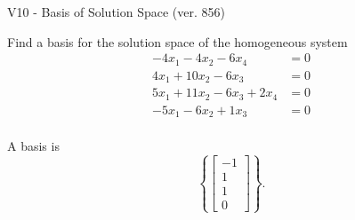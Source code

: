 \begin{exercise}
  \begin{exerciseTitle}V10 - Basis of Solution Space (ver. 856)\end{exerciseTitle}
  \begin{exerciseStatement}
    Find a basis for the solution space of the homogeneous system 
\begin{align*}
 -4 x_ 1 -4 x_ 2 -6 x_ 4 &= 0  \\ 
  4 x_ 1 + 10 x_ 2 -6 x_ 3 &= 0  \\ 
  5 x_ 1 + 11 x_ 2 -6 x_ 3 + 2 x_ 4 &= 0  \\ 
  -5 x_ 1 -6 x_ 2 + 1 x_ 3 &= 0  \\ 
 \end{align*}


 
  \end{exerciseStatement}

  \begin{exerciseAnswer}
   A basis is   
\[\left\{\left[\begin{array}{c}
-1 \\
1 \\
1 \\
0
\end{array}\right]\right\}.\]

  


  \end{exerciseAnswer}
\end{exercise}
